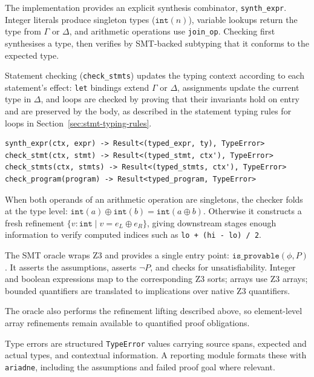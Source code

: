\pagebreak[3]
The implementation provides an explicit synthesis combinator, \texttt{synth\_expr}. Integer literals produce singleton types ($\mathtt{int}(n)$), variable lookups return the type from $\Gamma$ or $\Delta$, and arithmetic operations use \texttt{join\_op}. Checking first synthesises a type, then verifies by SMT-backed subtyping that it conforms to the expected type.

Statement checking (\texttt{check\_stmts}) updates the typing context according to each statement's effect: \texttt{let} bindings extend $\Gamma$ or $\Delta$, assignments update the current type in $\Delta$, and loops are checked by proving that their invariants hold on entry and are preserved by the body, as described in the statement typing rules for loops in Section~\ref{sec:stmt-typing-rules}.

\begin{verbatim}
synth_expr(ctx, expr) -> Result<(typed_expr, ty), TypeError>
check_stmt(ctx, stmt) -> Result<(typed_stmt, ctx'), TypeError>
check_stmts(ctx, stmts) -> Result<(typed_stmts, ctx'), TypeError>
check_program(program) -> Result<typed_program, TypeError>
\end{verbatim}

When both operands of an arithmetic operation are singletons, the checker folds at the type level: $\mathtt{int}(a) \oplus \mathtt{int}(b) = \mathtt{int}(a \oplus b)$. Otherwise it constructs a fresh refinement $\{v\!:\!\mathtt{int} \mid v = e_L \oplus e_R\}$, giving downstream stages enough information to verify computed indices such as \texttt{lo + (hi - lo) / 2}.

\label{sec:smt-oracle}The SMT oracle wraps Z3 and provides a single entry point: $\texttt{is\_provable}(\phi, P)$. It asserts the assumptions, asserts $\lnot P$, and checks for unsatisfiability. Integer and boolean expressions map to the corresponding Z3 sorts; arrays use Z3 arrays; bounded quantifiers are translated to implications over native Z3 quantifiers.

The oracle also performs the refinement lifting described above, so element-level array refinements remain available to quantified proof obligations.

Type errors are structured \texttt{TypeError} values carrying source spans, expected and actual types, and contextual information. A reporting module formats these with \texttt{ariadne}, including the assumptions and failed proof goal where relevant.

